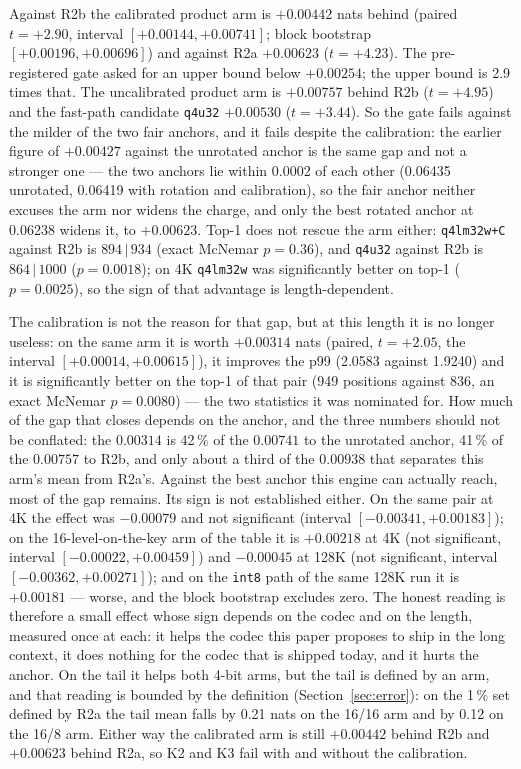 \documentclass[10pt,twocolumn]{article}
\begin{document}
Against R2b the calibrated product arm is $+0.00442$ nats behind (paired $t = +2.90$, interval $[+0.00144, +0.00741]$; block bootstrap $[+0.00196, +0.00696]$) and against R2a $+0.00623$ ($t = +4.23$). The pre-registered gate asked for an upper bound below $+0.00254$; the upper bound is 2.9 times that. The uncalibrated product arm is $+0.00757$ behind R2b ($t = +4.95$) and the fast-path candidate \texttt{q4u32} $+0.00530$ ($t = +3.44$). So the gate fails against the milder of the two fair anchors, and it fails despite the calibration: the earlier figure of $+0.00427$ against the unrotated anchor is the same gap and not a stronger one --- the two anchors lie within 0.0002 of each other (0.06435 unrotated, 0.06419 with rotation and calibration), so the fair anchor neither excuses the arm nor widens the charge, and only the best rotated anchor at 0.06238 widens it, to $+0.00623$. Top-1 does not rescue the arm either: \texttt{q4lm32w+C} against R2b is $894\,|\,934$ (exact McNemar $p = 0.36$), and \texttt{q4u32} against R2b is $864\,|\,1000$ ($p = 0.0018$); on 4K \texttt{q4lm32w} was significantly better on top-1 ($p = 0.0025$), so the sign of that advantage is length-dependent.

The calibration is not the reason for that gap, but at this length it is no longer useless: on the same arm it is worth $+0.00314$ nats (paired, $t = +2.05$, the interval $[+0.00014, +0.00615]$), it improves the p99 (2.0583 against 1.9240) and it is significantly better on the top-1 of that pair (949 positions against 836, an exact McNemar $p = 0.0080$) --- the two statistics it was nominated for. How much of the gap that closes depends on the anchor, and the three numbers should not be conflated: the $0.00314$ is 42\,\% of the $0.00741$ to the unrotated anchor, 41\,\% of the $0.00757$ to R2b, and only about a third of the $0.00938$ that separates this arm's mean from R2a's. Against the best anchor this engine can actually reach, most of the gap remains. Its sign is not established either. On the same pair at 4K the effect was $-0.00079$ and not significant (interval $[-0.00341, +0.00183]$); on the 16-level-on-the-key arm of the table it is $+0.00218$ at 4K (not significant, interval $[-0.00022, +0.00459]$) and $-0.00045$ at 128K (not significant, interval $[-0.00362, +0.00271]$); and on the \texttt{int8} path of the same 128K run it is $+0.00181$ --- worse, and the block bootstrap excludes zero. The honest reading is therefore a small effect whose sign depends on the codec and on the length, measured once at each: it helps the codec this paper proposes to ship in the long context, it does nothing for the codec that is shipped today, and it hurts the anchor. On the tail it helps both 4-bit arms, but the tail is defined by an arm, and that reading is bounded by the definition (Section~\ref{sec:error}): on the 1\,\% set defined by R2a the tail mean falls by 0.21 nats on the 16/16 arm and by 0.12 on the 16/8 arm. Either way the calibrated arm is still $+0.00442$ behind R2b and $+0.00623$ behind R2a, so K2 and K3 fail with and without the calibration.
\end{document}
